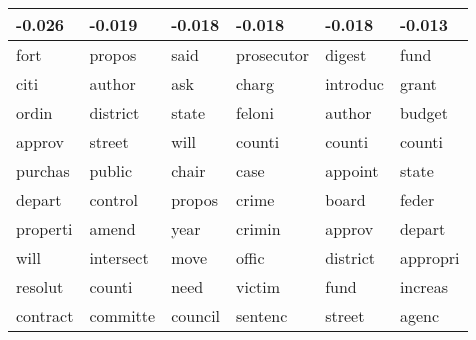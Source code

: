 \begin{table}[ht]
\centering
\begin{tabular}{llllll}
  \hline
-0.026 & -0.019 & -0.018 & -0.018 & -0.018 & -0.013 \\ 
  \hline
fort & propos & said & prosecutor & digest & fund \\ 
  citi & author & ask & charg & introduc & grant \\ 
  ordin & district & state & feloni & author & budget \\ 
  approv & street & will & counti & counti & counti \\ 
  purchas & public & chair & case & appoint & state \\ 
  depart & control & propos & crime & board & feder \\ 
  properti & amend & year & crimin & approv & depart \\ 
  will & intersect & move & offic & district & appropri \\ 
  resolut & counti & need & victim & fund & increas  \\ 
  contract & committe & council & sentenc & street & agenc \\ 
   \hline
\end{tabular}
\label{tabSTMINDem}
\end{table}


